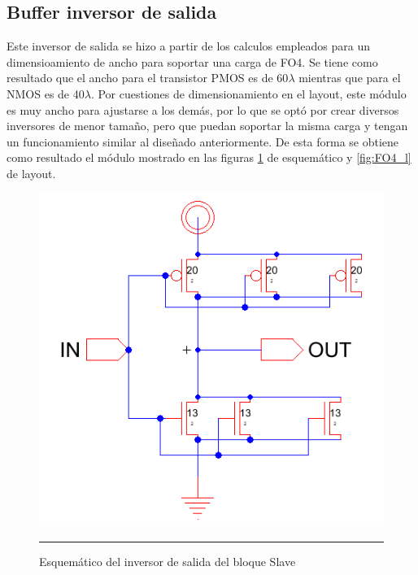 \documentclass[12pt,a4paper]{article} %
\begin{document}
\subsection{Buffer inversor de salida}

Este inversor de salida se hizo a partir de los calculos empleados para un dimensioamiento de ancho para soportar una carga de FO4. Se tiene como resultado que el ancho para el transistor PMOS es de 60$\lambda$ mientras que para el NMOS es de 40$\lambda$.
Por cuestiones de dimensionamiento en el layout, este módulo es muy ancho para ajustarse a los demás, por lo que se optó por crear diversos inversores de menor tamaño, pero que puedan soportar la misma carga y tengan un funcionamiento similar al diseñado anteriormente. De esta forma se obtiene como resultado el módulo mostrado en las figuras \ref{fig:FO4_s} de esquemático y \ref{fig:FO4_l} de layout.

\begin{figure}[htbp]
  \centering
    \includegraphics[scale=0.45]{./FO4_s.png}
    \rule{35em}{0.5pt}
  \caption[FO4]{Esquemático del inversor de salida del bloque Slave}
  \label{fig:FO4_s}
\end{figure}
\end{document}
